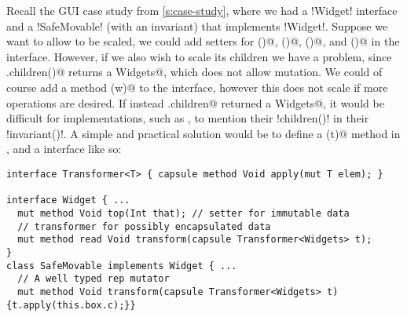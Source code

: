 Recall the GUI case study from \autoref{s:case-study}, where we had a \Q!Widget! interface and a \Q!SafeMovable! (with an invariant) that implements \Q!Widget!.
Suppose we want to allow \Q@Widget@s to be scaled, we could add \Q@mut@ setters for \Q@width()@, \Q@height()@, \Q@left()@, and \Q@top()@ in the \Q@Widget@ interface. However, if we also wish to scale its children we have a problem, since \Q@Widget.children()@ returns a \Q@read Widgets@, which does not allow mutation. We could of course add a \Q@mut@ method \Q@zoom(w)@ to the \Q@Widget@ interface, however this does not scale if more operations are desired. If instead \Q@Widget.children@ returned a \Q@mut Widgets@, it would be difficult for \Q@Widget@ implementations, such as \Q@SafeMovable@, 
to mention their \Q!children()! in their \Q!invariant()!.
A simple and practical solution would be to define a \Q@transform(t)@ method in \Q@Widget@, and a \Q@Transformer@ interface 
like so:
\begin{lstlisting}[escapechar=\%]
interface Transformer<T> { capsule method Void apply(mut T elem); }

interface Widget { ...
  mut method Void top(Int that); // setter for immutable data
  // transformer for possibly encapsulated data
  mut method read Void transform(capsule Transformer<Widgets> t);
}
class SafeMovable implements Widget { ...
  // A well typed rep mutator
  mut method Void transform(capsule Transformer<Widgets> t) {t.apply(this.box.c);}}
\end{lstlisting}
